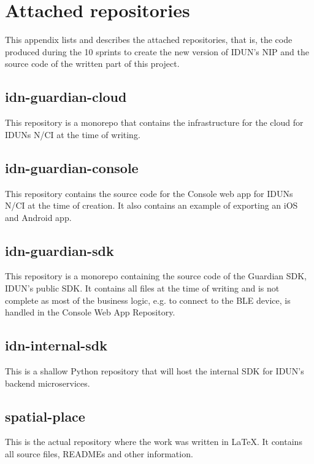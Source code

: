 \chapter{Attached repositories}
\label{appendix6-attached-repositories}

This appendix lists and describes the attached repositories, that is, the code produced during the 10 sprints to create the new version of IDUN’s NIP and the source code of the written part of this project.

\section*{idn-guardian-cloud}

This repository is a monorepo that contains the infrastructure for the cloud for IDUNs N/CI at the time of writing.

\section*{idn-guardian-console}

This repository contains the source code for the Console web app for IDUNs N/CI at the time of creation. It also contains an example of exporting an iOS and Android app.

\section*{idn-guardian-sdk}

This repository is a monorepo containing the source code of the Guardian SDK, IDUN’s public SDK. It contains all files at the time of writing and is not complete as most of the business logic, e.g. to connect to the BLE device, is handled in the Console Web App Repository.

\section*{idn-internal-sdk}

This is a shallow Python repository that will host the internal SDK for IDUN’s backend microservices.

\section*{spatial-place}

This is the actual repository where the work was written in LaTeX. It contains all source files, READMEs and other information.
